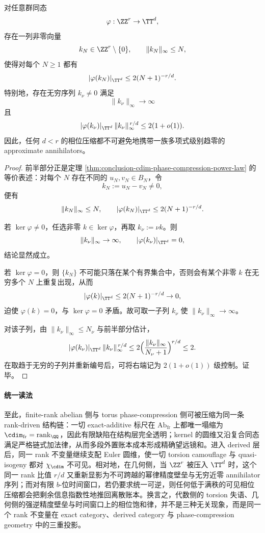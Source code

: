 \begin{theorem}\label{thm:conclusion-phase-compression-infinite-approximate-annihilators}
对任意群同态
\[
\varphi:\ZZ^r\to \TT^d,
\]
存在一列非零向量
\[
k_N\in \ZZ^r\setminus\{0\},
\qquad
\|k_N\|_\infty\le N,
\]
使得对每个 \(N\ge 1\) 都有
\[
|\varphi(k_N)|_{\TT^d}\le 2(N+1)^{-r/d}.
\]
特别地，存在无穷序列 \(k_\nu\neq 0\) 满足
\[
\|k_\nu\|_\infty\to\infty
\]
且
\[
|\varphi(k_\nu)|_{\TT^d}\,\|k_\nu\|_\infty^{\,r/d}\le 2(1+o(1)).
\]
因此，任何 \(d<r\) 的相位压缩都不可避免地携带一族多项式级别趋零的 approximate annihilators。
\end{theorem}
\begin{proof}
前半部分正是定理 \ref{thm:conclusion-cdim-phase-compression-power-law} 的等价表述：对每个 \(N\) 存在不同的 \(u_N,v_N\in B_N\)，令
\[
k_N:=u_N-v_N\neq 0,
\]
便有
\[
\|k_N\|_\infty\le N,
\qquad
|\varphi(k_N)|_{\TT^d}\le 2(N+1)^{-r/d}.
\]

若 \(\ker\varphi\neq 0\)，任选非零 \(k\in\ker\varphi\)，再取 \(k_\nu:=\nu k\)。则
\[
\|k_\nu\|_\infty\to\infty,
\qquad
|\varphi(k_\nu)|_{\TT^d}=0,
\]
结论显然成立。

若 \(\ker\varphi=0\)，则 \(\{k_N\}\) 不可能只落在某个有界集合中，否则会有某个非零 \(k\) 在无穷多个 \(N\) 上重复出现，从而
\[
|\varphi(k)|_{\TT^d}\le 2(N+1)^{-r/d}\to 0,
\]
迫使 \(\varphi(k)=0\)，与 \(\ker\varphi=0\) 矛盾。故可取一子列 \(k_\nu\) 使 \(\|k_\nu\|_\infty\to\infty\)。

对该子列，由 \(\|k_\nu\|_\infty\le N_\nu\) 与前半部分估计，
\[
|\varphi(k_\nu)|_{\TT^d}\,\|k_\nu\|_\infty^{\,r/d}
\le
2\Bigl(\frac{\|k_\nu\|_\infty}{N_\nu+1}\Bigr)^{r/d}
\le 2.
\]
在取趋于无穷的子列并重新编号后，可将右端记为 \(2(1+o(1))\) 级控制。证毕。
\end{proof}



\paragraph{统一读法}
至此，finite-rank abelian 侧与 torus phase-compression 侧可被压缩为同一条 rank-driven 结构链：一切 exact-additive 标尺在 \(\mathrm{Ab}_{\mathrm{fr}}\) 上都唯一塌缩为 \(\cdim_{\mathrm{fr}}=\operatorname{rank}_{\QQ}\)，因此有限缺陷在结构层完全透明；kernel 的圆维又沿复合同态满足严格链式加法律，从而多段外置账本成本形成精确望远镜和。进入 derived 层后，同一 rank 不变量继续支配 Euler 圆维，使一切 torsion camouflage 与 quasi-isogeny 都对 \(\chi_{\cdim}\) 不可见。相对地，在几何侧，当 \(\ZZ^r\) 被压入 \(\TT^d\) 时，这个同一 rank 比值 \(r/d\) 又重新显影为不可跨越的幂律精度壁垒与无穷近零 annihilator 序列；而对有限 \(b\)-位时间窗口，若仍要求统一可逆，则任何低于满秩的可见相位压缩都会把剩余信息指数性地推回离散账本。换言之，代数侧的 torsion 失语、几何侧的强逆精度壁垒与时间窗口上的相位饱和律，并不是三种无关现象，而是同一个 rank 不变量在 exact category、derived category 与 phase-compression geometry 中的三重投影。

\endinput
